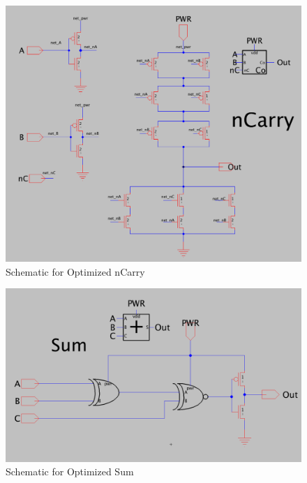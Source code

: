\documentclass{article}
\begin{document}
\begin{figure}[H]
  \includegraphics[width=\linewidth]{opt_screenshots/opt_ncarry_sch.png}
  \caption{Schematic for Optimized nCarry}
  \label{fig:opt_ncarry_sch}
\end{figure}

\begin{figure}[H]
  \includegraphics[width=\linewidth]{opt_screenshots/opt_sum_sch.png}
  \caption{Schematic for Optimized Sum}
  \label{fig:opt_sum_sch}
\end{figure}
\end{document}
